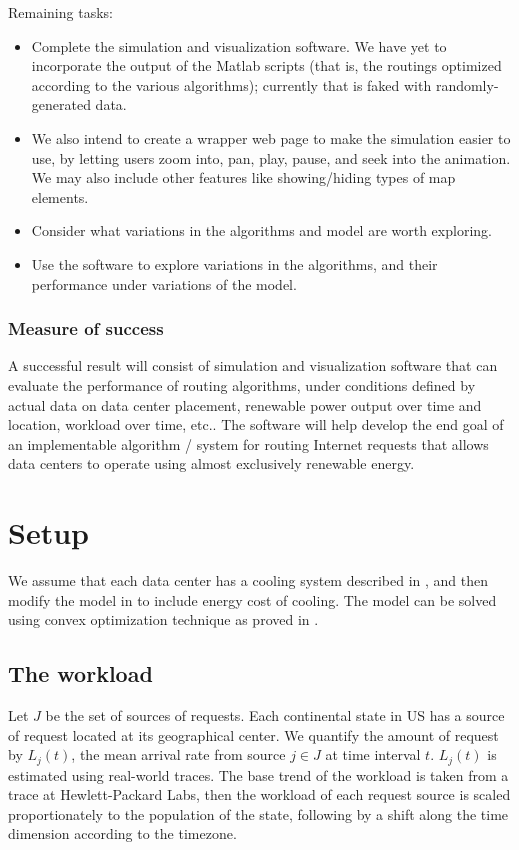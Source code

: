 \documentclass{acm_proc_article-sp}
\begin{document}
Remaining tasks:
\begin{itemize}
\item Complete the simulation and visualization software. We have yet to incorporate the output of the Matlab scripts (that is, the routings optimized according to the various algorithms); currently that is faked with randomly-generated data.
\item We also intend to create a wrapper web page to make the simulation easier to use, by letting users zoom into, pan, play, pause, and seek into the animation. We may also include other features like showing/hiding types of map elements.
\item Consider what variations in the algorithms and model are worth exploring.
\item Use the software to explore variations in the algorithms, and their performance under variations of the model.
\end{itemize}

\subsubsection{Measure of success}
A successful result will consist of simulation and visualization software that can evaluate the performance of routing algorithms, under conditions defined by actual data on data center placement, renewable power output over time and location, workload over time, etc.. The software will help develop the end goal of an implementable algorithm / system for routing Internet requests that allows data centers to operate using almost exclusively renewable energy.

\section{Setup}
We assume that each data center has a cooling system described in \cite{adam:cooling}, and then modify the model in \cite{adam:GLB} to include energy cost of cooling. The model can be solved using convex optimization technique as proved in \cite{adam:GLBfull}.
\subsection{The workload}
Let $J$ be the set of sources of requests. Each continental state in US has a source of request located at its geographical center. We quantify the amount of request by $L_j(t)$, the mean arrival rate from source $j \in J$ at time interval $t$. $L_j(t)$ is estimated using real-world traces. The base trend of the workload is taken from a trace at Hewlett-Packard Labs, then the workload of each request source is scaled proportionately to the population of the state, following by a shift along the time dimension according to the timezone.
\end{document}
